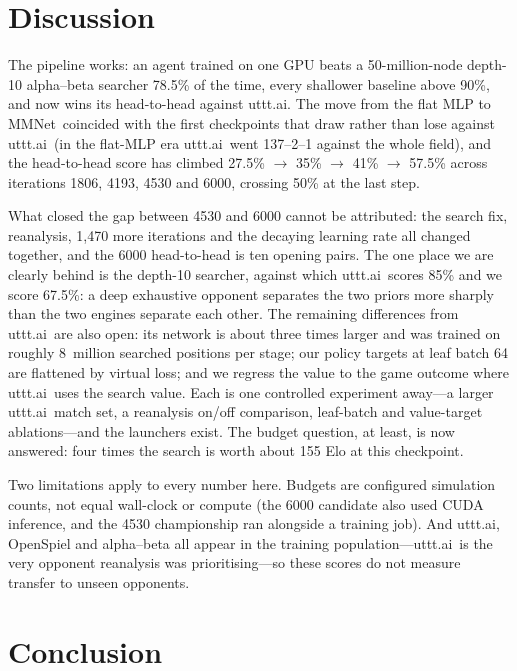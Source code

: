 \documentclass[conference]{IEEEtran}
\newcommand{\utttai}{uttt.ai}
\newcommand{\net}{MMNet}       %
\begin{document}
\section{Discussion}
\label{sec:discussion}

The pipeline works: an agent trained on one GPU beats a 50-million-node
depth-10 alpha--beta searcher 78.5\% of the time, every shallower baseline
above 90\%, and now wins its head-to-head against \utttai. The move from the flat
MLP to \net\ coincided with the first checkpoints that draw rather than
lose against \utttai\ (in the flat-MLP era \utttai\ went 137--2--1 against
the whole field), and the head-to-head score has climbed 27.5\% $\to$ 35\%
$\to$ 41\% $\to$ 57.5\% across iterations 1806, 4193, 4530 and 6000,
crossing 50\% at the last step.

What closed the gap between 4530 and 6000 cannot be attributed: the
search fix, reanalysis, 1{,}470 more iterations and the decaying learning
rate all changed together, and the 6000 head-to-head is ten opening pairs.
The one place we are clearly behind is the depth-10 searcher, against which
\utttai\ scores 85\% and we score 67.5\%: a deep exhaustive opponent
separates the two priors more sharply than the two engines separate each
other. The remaining differences from \utttai\ are also open: its network is
about three times larger and was trained on roughly 8~million searched
positions per stage; our policy targets at leaf batch 64 are flattened by
virtual loss; and we regress the value to the game outcome where \utttai\
uses the search value. Each is one controlled experiment away---a larger
\utttai\ match set, a reanalysis on/off comparison, leaf-batch and
value-target ablations---and the launchers exist. The budget question, at
least, is now answered: four times the search is worth about 155 Elo at this
checkpoint.

Two limitations apply to every number here. Budgets are configured
simulation counts, not equal wall-clock or compute (the 6000 candidate also
used CUDA inference, and the 4530 championship ran alongside a training
job). And \utttai, OpenSpiel and alpha--beta all appear in the training
population---\utttai\ is the very opponent reanalysis was prioritising---so
these scores do not measure transfer to unseen opponents.

\section{Conclusion}
\end{document}
